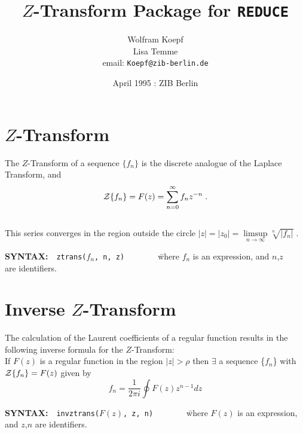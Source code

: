 \title{{\bf $Z$-Transform Package for {\tt REDUCE}}}
\author{Wolfram Koepf \\ Lisa Temme \\ email: {\tt Koepf@zib-berlin.de}}
\date{April 1995 : ZIB Berlin}

\maketitle
\section{$Z$-Transform}

  The $Z$-Transform of a sequence $\{f_n\}$ is the discrete analogue
  of the Laplace Transform, and
  \[{\cal Z}\{f_n\} = F(z) = \sum^\infty_{n=0} f_nz^{-n}\;.\] \\
  This series converges in the region outside the circle
  $|z|=|z_0|= \limsup\limits_{n \rightarrow \infty} \sqrt[n]{|f_n|}\;.$


\begin{tabbing}

{\bf SYNTAX:}\ \ {\tt ztrans($f_n$, n,  z)}\ \ \ \ \ \ \ \
  \=where $f_n$ is an expression, and $n$,$z$ \\
  \> are identifiers.\\
\end{tabbing}


\section{Inverse $Z$-Transform}
  The calculation of the Laurent coefficients of a regular function
  results in the following inverse formula for the $Z$-Transform:
  \\
  If $F(z)$ is a regular function in the region $|z|> \rho$ then
  $\exists$ a sequence \{$f_n$\} with ${\cal Z} \{f_n\}=F(z)$
  given by
  \[f_n = \frac{1}{2 \pi i}\oint F(z) z^{n-1} dz\]


\begin{tabbing}

{\bf SYNTAX:}\ \ {\tt invztrans($F(z)$, z,  n)}\ \ \ \ \ \ \ \
  \=where $F(z)$ is an expression, \\
  \> and $z$,$n$ are identifiers.
\end{tabbing}


